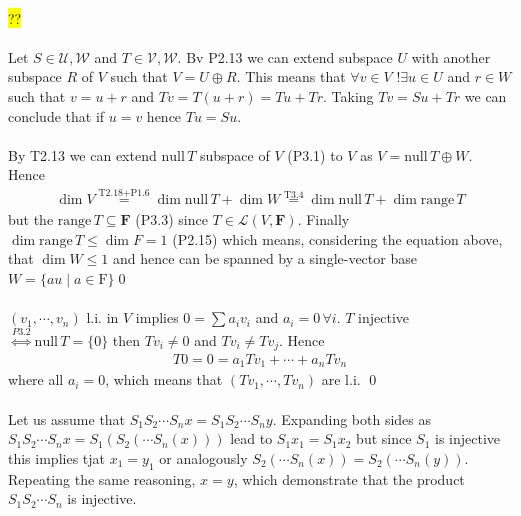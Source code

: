 \documentclass[11pt,notitlepage,oneside]{article}
\newcommand{\hilight}[1]{\colorbox{yellow}{#1}}
\DeclareMathOperator{\dimension}{dim}
\newcommand{\exo}[1]{%
\addtocontents{toc}{\protect\setcounter{tocdepth}{2}}%
\paragraph{#1}}
\newcommand{\nullspace}[1]{\mathrm{null}\,{#1}}
\newcommand{\rangespace}[1]{\mathrm{range}\,{#1}}
\begin{document}
  \exo{}
  \hilight{??}
  
  \exo{} Let $S\in\mathcal{U,W}$ and $T\in\mathcal{V,W}$. Bv P2.13 we can extend subspace $U$ with another subspace $R$ of $V$ such that $V=U\oplus R$. This means that $\forall v\in V$ $!\exists u\in U$ and $r\in W$ such that $v=u+r$ and $Tv=T(u+r)=Tu+Tr$. Taking $Tv = Su +Tr$ we can conclude that if $u=v$ hence $Tu=Su$. 
  \exo{} By T2.13 we can extend $\nullspace{T}$ subspace of $V$ (P3.1) to $V$ as $V = \nullspace{T} \oplus W$. Hence
  \begin{align*}
  \dimension{V} \stackrel{\text{T2.18}+\text{P1.6}}{=} \dimension{\nullspace{T}} + \dimension{W} \stackrel{\text{T3.4}}{=} \dimension{\nullspace{T}} + \dimension{\rangespace{T}}
  \end{align*} 
  but the $\rangespace{T}\subseteq \mathbf{F}$ (P3.3) since $T\in\mathcal{L}(V,\mathbf{F})$. Finally $\dimension{\rangespace{T}}\leq\dimension{F}=1$ (P2.15) which means, considering the equation above, that $\dimension{W}\leq 1$ and hence can be spanned by a single-vector base $W=\{au \mid a\in\mathrm{F}\}$\qed
  
  \exo{} $(v_1,\cdots,v_n)$ l.i. in $V$ implies $0=\sum a_iv_i$ and $a_i=0\,\forall i$. $T$ injective $\stackrel{P3.2}{\iff} \nullspace{T}=\{0\}$ then $Tv_i\neq 0$ and $Tv_i\neq Tv_j$. Hence 
  \begin{align*}
  T0 = 0 = a_1 Tv_1 + \cdots + a_n Tv_n
  \end{align*}
  where all $a_i=0$, which means that $(Tv_1,\cdots,Tv_n)$ are l.i. \qed
  \exo{} Let us assume that $S_1S_2\cdots S_nx = S_1S_2\cdots S_ny$. 
  Expanding both sides as $S_1S_2\cdots S_nx = S_1(S_2( \cdots S_n(x) ))$ lead to $S_1 x_1 = S_1 x_2$ but since $S_1$ is injective this implies tjat $x_1 = y_1$ or analogously $S_2( \cdots S_n(x)) = S_2( \cdots S_n(y))$. Repeating the same reasoning, $x=y$, which demonstrate that the product $S_1S_2\cdots S_n$ is injective.
  
\end{document}
